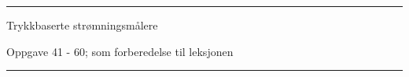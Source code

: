 \vskip 10pt



\filbreak
\hrule \vskip 5pt
\noindent {}

\vskip 5pt


\vskip 2pt  Trykkbaserte strømningsmålere

\vskip 2pt \noindent Oppgave 41 - 60;  som forberedelse til leksjonen%

\vskip 10pt




\filbreak
\hrule \vskip 5pt








%

